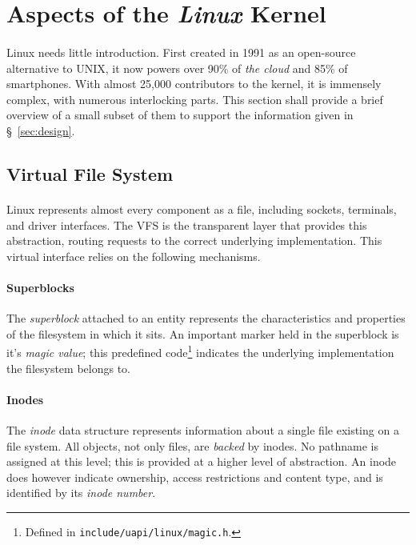 
\section{Aspects of the \textit{Linux} Kernel}

\paragraph{} Linux needs little introduction. First created in 1991 as an open-source alternative to UNIX, it now powers over 90\% of \textit{the cloud} and 85\% of smartphones. With almost 25,000 contributors to the kernel, it is immensely complex, with numerous interlocking parts. This section shall provide a brief overview of a small subset of them to support the information given in §~\ref{sec:design}.

\subsection{Virtual File System}

\paragraph{} Linux represents almost every component as a file, including sockets, terminals, and driver interfaces. The VFS is the transparent layer that provides this abstraction, routing requests to the correct underlying implementation. This virtual interface relies on the following mechanisms.

\paragraph{Superblocks} The \textit{superblock} attached to an entity represents the characteristics and properties of the filesystem in which it sits. An important marker held in the superblock is it's \textit{magic value}; this predefined code\footnote{Defined in \texttt{include/uapi/linux/magic.h}.} indicates the underlying implementation the filesystem belongs to.

\paragraph{Inodes} The \textit{inode} data structure represents information about a single file existing on a file system. All objects, not only files, are \textit{backed} by inodes. No pathname is assigned at this level; this is provided at a higher level of abstraction. An inode does however indicate ownership, access restrictions and content type, and is identified by its \textit{inode number}.

